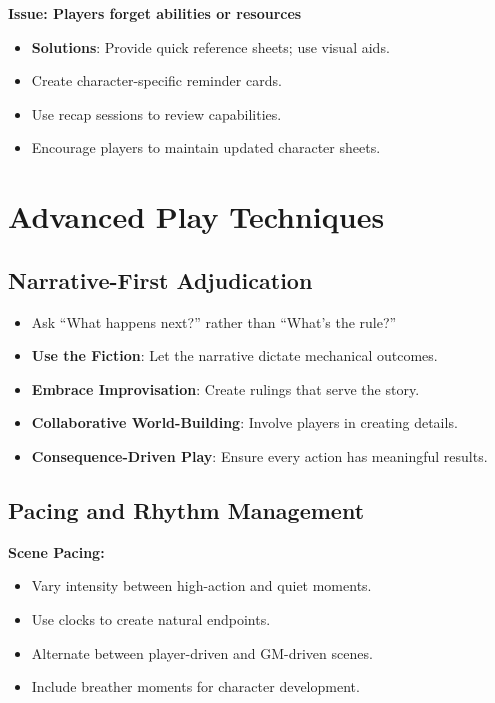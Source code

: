 \textbf{Issue: Players forget abilities or resources}
\begin{itemize}
\item \textbf{Solutions}: Provide quick reference sheets; use visual aids.
\item Create character-specific reminder cards.
\item Use recap sessions to review capabilities.
\item Encourage players to maintain updated character sheets.
\end{itemize}

\section{Advanced Play Techniques}
\label{sec:advanced-techniques}

\subsection{Narrative-First Adjudication}
\label{subsec:narrative-adjudication}

\begin{itemize}
\item Ask “What happens next?” rather than “What’s the rule?”
\item \textbf{Use the Fiction}: Let the narrative dictate mechanical outcomes.
\item \textbf{Embrace Improvisation}: Create rulings that serve the story.
\item \textbf{Collaborative World-Building}: Involve players in creating details.
\item \textbf{Consequence-Driven Play}: Ensure every action has meaningful results.
\end{itemize}

\subsection{Pacing and Rhythm Management}
\label{subsec:pacing-management}

\textbf{Scene Pacing:}
\begin{itemize}
\item Vary intensity between high-action and quiet moments.
\item Use clocks to create natural endpoints.
\item Alternate between player-driven and GM-driven scenes.
\item Include breather moments for character development.
\end{itemize}

